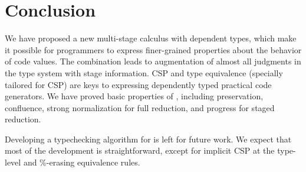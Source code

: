
\section{Conclusion \label{sec:conclusion}}

We have proposed a new multi-stage calculus \LMD with dependent types,
which make it possible for programmers to express finer-grained
properties about the behavior of code values.  The combination leads
to augmentation of almost all judgments in the type system with stage
information.  CSP and type equivalence (specially tailored for CSP) are
keys to expressing dependently typed practical code generators.  We
have proved basic properties of \LMD, including preservation,
confluence, strong normalization for full reduction, and progress for
staged reduction.

Developing a typechecking algorithm for \LMD is left for future
work.  We expect that most of the development is straightforward,
except for implicit CSP at the type-level and \%-erasing equivalence
rules.
